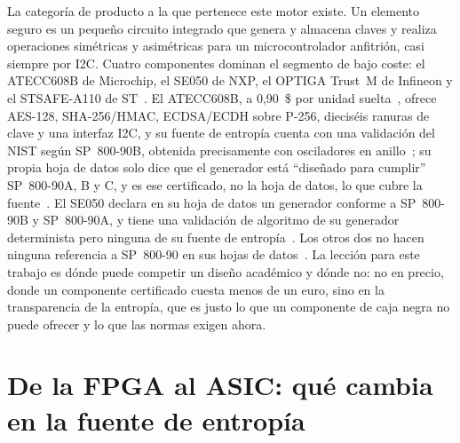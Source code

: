 La categoría de producto a la que pertenece este motor existe. Un
elemento seguro es un pequeño circuito integrado que genera y almacena
claves y realiza operaciones simétricas y asimétricas para un
microcontrolador anfitrión, casi siempre por I2C. Cuatro componentes
dominan el segmento de bajo coste: el ATECC608B de Microchip, el SE050 de
NXP, el OPTIGA Trust~M de Infineon y el STSAFE-A110 de ST~\cite{microchip_atecc608b_ds,
nxp_se050_ds, infineon_optiga_trustm_ds, st_stsafe_a110_ds}. El
ATECC608B, a 0,90~\$ por unidad suelta~\cite{digikey_prices_2026}, ofrece
AES-128, SHA-256/HMAC, ECDSA/ECDH sobre P-256, dieciséis ranuras de clave
y una interfaz I2C, y su fuente de entropía cuenta con una validación del
NIST según SP~800-90B, obtenida precisamente con osciladores en
anillo~\cite{nist_esv_e46}; su propia hoja de datos solo dice que el
generador está ``diseñado para cumplir'' SP~800-90A, B y C, y es ese
certificado, no la hoja de datos, lo que cubre la
fuente~\cite{microchip_atecc608b_ds}. El SE050 declara en su hoja de
datos un generador conforme a SP~800-90B y SP~800-90A, y tiene una
validación de algoritmo de su generador determinista pero ninguna de su
fuente de entropía~\cite{nxp_se050_ds, nist_cmvp_3840}. Los otros dos no
hacen ninguna referencia a SP~800-90 en sus hojas de
datos~\cite{infineon_optiga_trustm_ds,
st_stsafe_a110_ds}. La lección para este
trabajo es dónde puede competir un diseño académico y dónde no: no en
precio, donde un componente certificado cuesta menos de un euro, sino en
la transparencia de la entropía, que es justo lo que un componente de
caja negra no puede ofrecer y lo que las normas exigen ahora.

\section{De la FPGA al ASIC: qué cambia en la fuente de entropía}
\label{sec:soa_asic}

